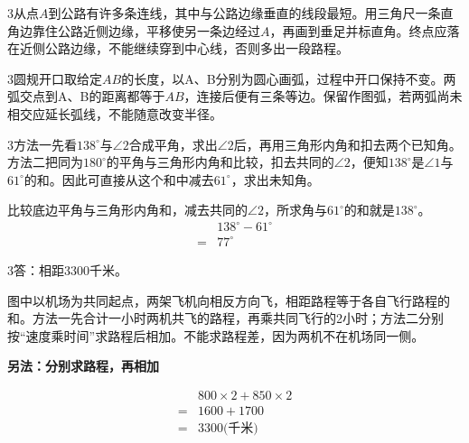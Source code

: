 \documentclass[multi=snippet,border={5bp 20bp 5bp 5bp}]{standalone}
\newenvironment{snippet}[3]{\begin{minipage}{#1bp}\color{answerred}\fontsize{#2}{#3}\selectfont\raggedright}{\end{minipage}}
\begin{document}
\begin{snippet}{505}{11.5}{14}\begin{multicols}{3}\raggedcolumns 从点\(A\)\allowbreak 到公路有许多条连线，其中与公路边缘垂直的线段最短。用三角尺一条直角边靠住公路近侧边缘，平移使另一条边经过\(A\)\allowbreak ，再画到垂足并标直角。终点应落在近侧公路边缘，不能继续穿到中心线，否则多出一段路程。\end{multicols}\end{snippet}
\begin{snippet}{505}{11.5}{14}\begin{multicols}{3}\raggedcolumns 圆规开口取给定\(AB\)\allowbreak 的长度，以A、B分别为圆心画弧，过程中开口保持不变。两弧交点到A、B的距离都等于\(AB\)\allowbreak ，连接后便有三条等边。保留作图弧，若两弧尚未相交应延长弧线，不能随意改变半径。\end{multicols}\end{snippet}
\begin{snippet}{505}{11.5}{14}\begin{multicols}{3}\raggedcolumns 方法一先看\(138^\circ\)\allowbreak 与\(\angle2\)\allowbreak 合成平角，求出\(\angle2\)\allowbreak 后，再用三角形内角和扣去两个已知角。方法二把同为\(180^\circ\)\allowbreak 的平角与三角形内角和比较，扣去共同的\(\angle2\)\allowbreak ，便知\(138^\circ\)\allowbreak 是\(\angle1\)\allowbreak 与\(61^\circ\)\allowbreak 的和。因此可直接从这个和中减去\(61^\circ\)\allowbreak ，求出未知角。\par 比较底边平角与三角形内角和，减去共同的\(\angle2\)\allowbreak ，所求角与\(61^\circ\)\allowbreak 的和就是\(138^\circ\)\allowbreak 。\[\begin{aligned}&138^\circ-61^\circ\\={}&77^\circ\end{aligned}\]\end{multicols}\end{snippet}
\begin{snippet}{505}{11.5}{14}\begin{multicols}{3}\raggedcolumns 答：相距3300千米。\par 图中以机场为共同起点，两架飞机向相反方向飞，相距路程等于各自飞行路程的和。方法一先合计一小时两机共飞的路程，再乘共同飞行的2小时；方法二分别按“速度乘时间”求路程后相加。不能求路程差，因为两机不在机场同一侧。\par \textbf{另法：分别求路程，再相加}\par \[\begin{aligned}&800\times2+850\times2\\={}&1600+1700\\={}&3300\text{(千米)}\end{aligned}\]\end{multicols}\end{snippet}
\end{document}

